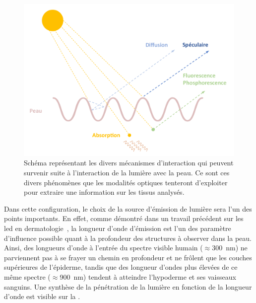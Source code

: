 \begin{figure}[H]
    \centering
    \includegraphics[width=\linewidth]{contents/chapter_2/resources/scheme_light_interaction.pdf}
    \caption{Schéma représentant les divers mécanismes d'interaction qui peuvent survenir suite à l'interaction de la lumière avec la peau. Ce sont ces divers phénomènes que les modalités optiques tenteront d'exploiter pour extraire une information sur les tissus analysés.}
    \label{fig:scheme_light_interaction}
\end{figure}\par

Dans cette configuration, le choix de la source d'émission de lumière sera l'un des points importants. En effet, comme démontré dans un travail précédent sur les \gls{led} en dermatologie~\cite{Barolet2008}, la longueur d'onde d'émission est l'un des paramètre d'influence possible quant à la profondeur des structures à observer dans la peau. Ainsi, des longueurs d'onde à l'entrée du spectre visible humain ($\approx$\SI{300}{\nano\metre}) ne parviennent pas à se frayer un chemin en profondeur et ne frôlent que les couches supérieures de l'épiderme, tandis que des longueur d'ondes plus élevées de ce même spectre ($\approx$\SI{900}{\nano\metre}) tendent à atteindre l'hypoderme et ses vaisseaux sanguins. Une synthèse de la pénétration de la lumière en fonction de la longueur d'onde est visible sur la .\par

